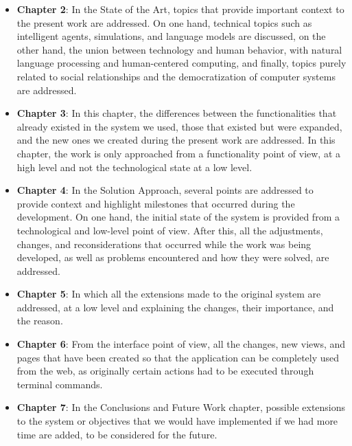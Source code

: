 \begin{itemize}
	
	\item \textbf{Chapter 2}: In the State of the Art, topics that provide important context to the present work are addressed. On one hand, technical topics such as intelligent agents, simulations, and language models are discussed, on the other hand, the union between technology and human behavior, with natural language processing and human-centered computing, and finally, topics purely related to social relationships and the democratization of computer systems are addressed.
	
	\item \textbf{Chapter 3}: In this chapter, the differences between the functionalities that already existed in the system we used, those that existed but were expanded, and the new ones we created during the present work are addressed. In this chapter, the work is only approached from a functionality point of view, at a high level and not the technological state at a low level.
	
	\item \textbf{Chapter 4}: In the Solution Approach, several points are addressed to provide context and highlight milestones that occurred during the development. On one hand, the initial state of the system is provided from a technological and low-level point of view. After this, all the adjustments, changes, and reconsiderations that occurred while the work was being developed, as well as problems encountered and how they were solved, are addressed.
	
	\item \textbf{Chapter 5}: In which all the extensions made to the original system are addressed, at a low level and explaining the changes, their importance, and the reason.
	
	\item \textbf{Chapter 6}: From the interface point of view, all the changes, new views, and pages that have been created so that the application can be completely used from the web, as originally certain actions had to be executed through terminal commands.
	
	\item \textbf{Chapter 7}: In the Conclusions and Future Work chapter, possible extensions to the system or objectives that we would have implemented if we had more time are added, to be considered for the future.
	
\end{itemize}
